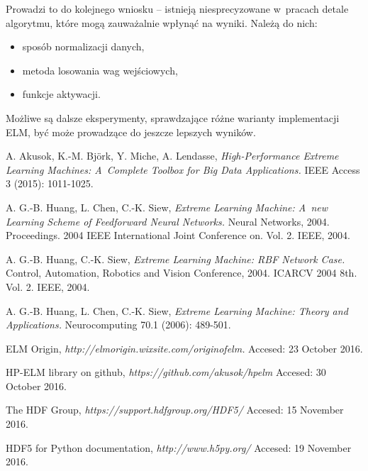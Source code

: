 \documentclass[pl]{minipw} %
\begin{document}
Prowadzi to do kolejnego wniosku -- istnieją niesprecyzowane w~pracach detale algorytmu, które mogą zauważalnie wpłynąć na wyniki.
Należą do nich:
\begin{itemize}
\item sposób normalizacji danych, 
\item metoda losowania wag wejściowych,
\item funkcje aktywacji.
\end{itemize}
Możliwe są dalsze eksperymenty, sprawdzające różne warianty implementacji ELM, być może prowadzące do jeszcze lepszych wyników.
\clearpage





\begin{thebibliography}{20}%

  A. Akusok, K.-M. Björk, Y. Miche, A. Lendasse,
  \emph{High-Performance Extreme Learning Machines: A~Complete Toolbox for Big Data Applications.}
  IEEE Access 3 (2015): 1011-1025.

  A. G.-B. Huang, L. Chen, C.-K. Siew, 
  \emph{Extreme Learning Machine: A~new Learning Scheme of Feedforward Neural Networks.}
   Neural Networks, 2004. Proceedings. 2004 IEEE International Joint Conference on. Vol. 2. IEEE, 2004.

  A. G.-B. Huang, C.-K. Siew, 
  \emph{Extreme Learning Machine: RBF Network Case.} 
  Control, Automation, Robotics and Vision Conference, 2004. ICARCV 2004 8th. Vol. 2. IEEE, 2004.

  A. G.-B. Huang, L. Chen, C.-K. Siew, 
  \emph{Extreme Learning Machine: Theory and Applications.} 
  Neurocomputing 70.1 (2006): 489-501.
  
  ELM Origin,
  \emph{http://elmorigin.wixsite.com/originofelm.}
  Accesed: 23 October 2016.
  
  HP-ELM library on github,
  \emph{https://github.com/akusok/hpelm}
   Accesed: 30 October 2016.

  
  The HDF Group,
  \emph{https://support.hdfgroup.org/HDF5/} 
  Accesed: 15 November 2016.
 
  
  HDF5 for Python documentation,
  \emph{http://www.h5py.org/}
  Accesed: 19 November 2016.


\end{thebibliography}
\end{document}
